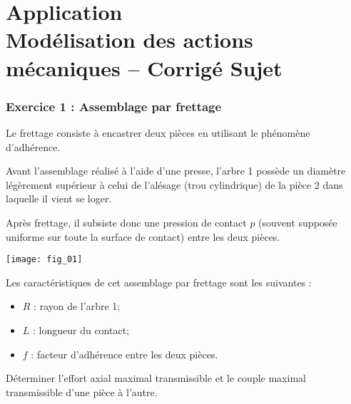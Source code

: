\chapter*{Application  \\ 
Modélisation des actions mécaniques -- \ifprof Corrigé \else Sujet \fi}

\iflivret {} \else
\ifprof  {} \else \fi
\fi

\setcounter{question}{0}



\subsection*{Exercice 1 : Assemblage par frettage}

Le frettage consiste à encastrer deux pièces en utilisant le phénomène d’adhérence. 
 
Avant l’assemblage réalisé à l’aide d’une presse, l’arbre 1 
possède un diamètre légèrement supérieur à celui de l’alésage 
(trou cylindrique) de la pièce 2 dans laquelle il vient se loger. 
 
Après frettage, il subsiste donc une pression de contact $p$ 
(souvent supposée uniforme sur toute la surface de contact) 
entre les deux pièces. 


\begin{marginfigure}
\texttt{[image: fig\_01]}
\end{marginfigure}
 
Les caractéristiques de cet assemblage par frettage sont les suivantes : 
\begin{itemize}
\item $R$ : rayon de l’arbre 1;
\item $L$ : longueur du contact; 
\item $f$ : facteur d’adhérence entre les deux pièces.
\end{itemize}





\begin{obj}
Déterminer l’effort axial maximal transmissible et le couple maximal transmissible d’une pièce à 
l’autre.
\end{obj}

